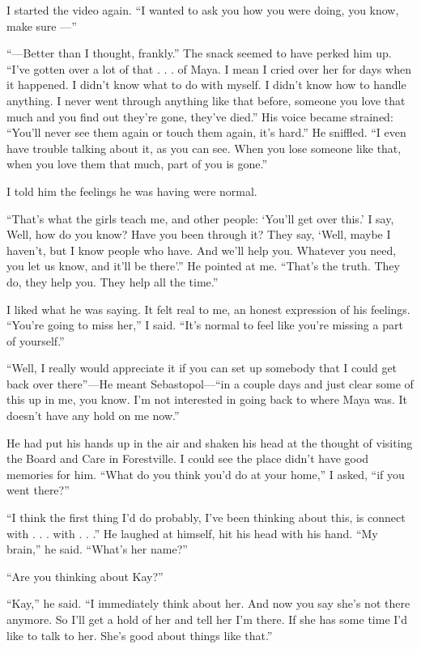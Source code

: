 \documentclass[12pt]{book}
\begin{document}
I started the video again. ``I wanted to ask you how you were doing, you know, make sure ---''

``---Better than I thought, frankly.'' The snack seemed to have perked him up. ``I've gotten over a lot of that . . . of Maya. I mean I cried over her for days when it happened. I didn't know what to do with myself. I didn't know how to handle anything. I never went through anything like that before, someone you love that much and you find out they're gone, they've died.'' His voice became strained: ``You'll never see them again or touch them again, it's hard.'' He sniffled. ``I even have trouble talking about it, as you can see. When you lose someone like that, when you love them that much, part of you is gone.''

I told him the feelings he was having were normal.

``That's what the girls teach me, and other people: `You'll get over this.' I say, Well, how do you know? Have you been through it? They say, `Well, maybe I haven't, but I know people who have. And we'll help you. Whatever you need, you let us know, and it'll be there'.'' He pointed at me. ``That's the truth. They do, they help you. They help all the time.''

I liked what he was saying. It felt real to me, an honest expression of his feelings. ``You're going to miss her,'' I said. ``It's normal to feel like you're missing a part of yourself.''

``Well, I really would appreciate it if you can set up somebody that I could get back over there''---He meant Sebastopol---``in a couple days and just clear some of this up in me, you know. I'm not interested in going back to where Maya was. It doesn't have any hold on me now.''

He had put his hands up in the air and shaken his head at the thought of visiting the Board and Care in Forestville. I could see the place didn't have good memories for him. ``What do you think you'd do at your home,'' I asked, ``if you went there?''

``I think the first thing I'd do probably, I've been thinking about this, is connect with . . . with . . .'' He laughed at himself, hit his head with his hand. ``My brain,'' he said. ``What's her name?''

``Are you thinking about Kay?''

``Kay,'' he said. ``I immediately think about her. And now you say she's not there anymore. So I'll get a hold of her and tell her I'm there. If she has some time I'd like to talk to her. She's good about things like that.''
\end{document}
